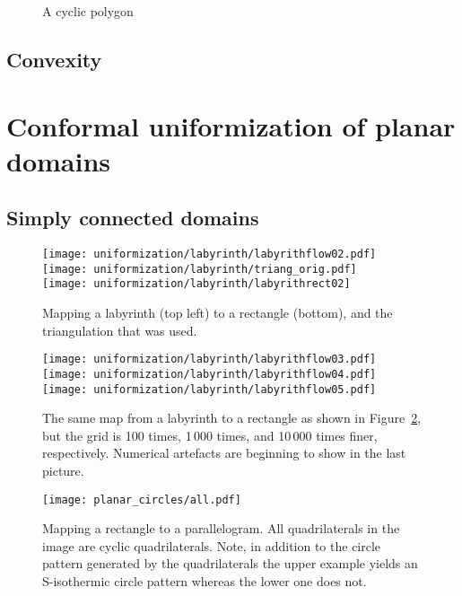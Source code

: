 \documentclass[Thesis.tex]{subfiles}
\begin{document}
\begin{figure}
\centering

\caption{A cyclic polygon}
\label{fig:cyclicpolygon}
\end{figure}


\subsection{Convexity}
\label{sec:convexity}

\section{Conformal uniformization of planar domains}
\subsection{Simply connected domains}

\begin{figure}
\centering
\texttt{[image: uniformization/labyrinth/labyrithflow02.pdf]}\hfill
\texttt{[image: uniformization/labyrinth/triang\_orig.pdf]}\\
\smallskip
\texttt{[image: uniformization/labyrinth/labyrithrect02]}
\caption{Mapping a labyrinth (top left) to a rectangle (bottom), and
the triangulation that was used.}
\label{fig:labyrinth1}
\end{figure}

\begin{figure}
\centering
\texttt{[image: uniformization/labyrinth/labyrithflow03.pdf]}\hfill
\texttt{[image: uniformization/labyrinth/labyrithflow04.pdf]}\hfill
\texttt{[image: uniformization/labyrinth/labyrithflow05.pdf]}
\caption{The same map from a labyrinth to a rectangle as shown in
Figure~\ref{fig:labyrinth1}, but the grid is 100 times, 1\,000
times, and 10\,000 times finer, respectively. Numerical artefacts
are beginning to show in the last picture.}
\end{figure}

\begin{figure}
\centering
\texttt{[image: planar\_circles/all.pdf]}
\caption{
Mapping a rectangle to a parallelogram.
All quadrilaterals in the image are cyclic quadrilaterals.
Note, in addition to the circle pattern generated by the quadrilaterals the upper example yields an S-isothermic circle pattern whereas the lower one does not.
}
\end{figure}
\end{document}
